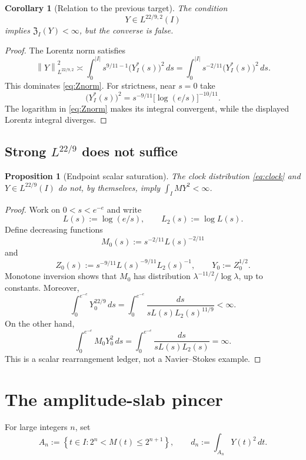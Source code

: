 \documentclass[11pt]{article}
\newtheorem{proposition}[theorem]{Proposition}
\newtheorem{corollary}[theorem]{Corollary}
\theoremstyle{remark}
\newcommand{\norm}[1]{\left\|#1\right\|}
\newcommand{\set}[1]{\left\{#1\right\}}
\newcommand{\cZ}{\mathfrak Z}
\begin{document}
\begin{corollary}[Relation to the previous target]
\label{cor:old-target}
The condition
\[
 Y\in L^{22/9,2}(I)
\]
implies \(\cZ_I(Y)<\infty\), but the converse is false.
\end{corollary}

\begin{proof}
The Lorentz norm satisfies
\[
 \norm{Y}_{L^{22/9,2}}^2
 \asymp
 \int_0^{|I|}
 s^{9/11-1}\bigl(Y_I^*(s)\bigr)^2\,ds
 =
 \int_0^{|I|}
 s^{-2/11}\bigl(Y_I^*(s)\bigr)^2\,ds.
\]
This dominates \eqref{eq:Znorm}.  For strictness, near \(s=0\) take
\[
 \bigl(Y_I^*(s)\bigr)^2
 =
 s^{-9/11}\bigl[\log(e/s)\bigr]^{-10/11}.
\]
The logarithm in \eqref{eq:Znorm} makes its integral convergent, while
the displayed Lorentz integral diverges.
\end{proof}

\subsection{Strong \texorpdfstring{\(L^{22/9}\)}{L22/9} does not suffice}

\begin{proposition}[Endpoint scalar saturation]
\label{prop:scalar-saturation}
The clock distribution \eqref{eq:clock} and
\(Y\in L^{22/9}(I)\) do not, by themselves, imply
\(\int_I MY^2<\infty\).
\end{proposition}

\begin{proof}
Work on \(0<s<e^{-e}\) and write
\[
 L(s):=\log(e/s),
 \qquad
 L_2(s):=\log L(s).
\]
Define decreasing functions
\[
 M_0(s):=s^{-2/11}L(s)^{-2/11}
\]
and
\[
 Z_0(s)
 :=
 s^{-9/11}L(s)^{-9/11}L_2(s)^{-1},
 \qquad
 Y_0:=Z_0^{1/2}.
\]
Monotone inversion shows that \(M_0\) has distribution
\(\lambda^{-11/2}/\log\lambda\), up to constants.  Moreover,
\[
 \int_0^{e^{-e}}Y_0^{22/9}\,ds
 =
 \int_0^{e^{-e}}
 \frac{ds}{sL(s)L_2(s)^{11/9}}
 <\infty.
\]
On the other hand,
\[
 \int_0^{e^{-e}}M_0Y_0^2\,ds
 =
 \int_0^{e^{-e}}
 \frac{ds}{sL(s)L_2(s)}
 =\infty.
\]
This is a scalar rearrangement ledger, not a Navier--Stokes example.
\end{proof}

\section{The amplitude-slab pincer}

For large integers \(n\), set
\begin{equation}
\label{eq:slabs}
 A_n:=\set{t\in I:2^n<M(t)\leq2^{n+1}},
 \qquad
 d_n:=\int_{A_n}Y(t)^2\,dt.
\end{equation}
\end{document}
